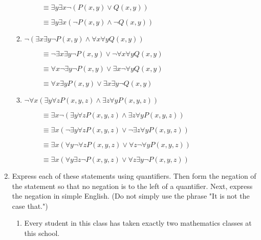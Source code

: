 \documentclass[11pt]{article}
\begin{document}
\begin{enumerate}[label=\textbf{\arabic*.}]
\begin{enumerate}[label=\textbf{\alph*)}]
		$\hspace{1cm}\equiv \exists y\exists x\neg(P(x, y) \lor Q(x, y))$
		
		$\hspace{1cm}\equiv \exists y\exists x(\neg P(x, y) \land \neg Q(x, y))$
		
		\item $\neg(\exists x\exists y\neg P(x, y) \land \forall x\forall yQ(x, y))$
		
		$\hspace{1cm}\equiv \neg\exists x\exists y\neg P(x, y) \lor \neg\forall x\forall yQ(x, y)$
		
		$\hspace{1cm}\equiv \forall x\neg\exists y\neg P(x, y) \lor \exists x\neg\forall yQ(x, y)$
		
		$\hspace{1cm}\equiv \forall x\exists yP(x, y) \lor \exists x\exists y\neg Q(x, y)$
		
		\item $\neg\forall x(\exists y\forall zP(x, y, z) \land \exists z\forall yP(x, y, z))$
		
		$\hspace{1cm}\equiv \exists x\neg(\exists y\forall zP(x, y, z) \land \exists z\forall yP(x, y, z))$
		
		$\hspace{1cm}\equiv \exists x(\neg\exists y\forall zP(x, y, z) \lor \neg\exists z\forall yP(x, y, z))$
		
		$\hspace{1cm}\equiv \exists x(\forall y\neg\forall zP(x, y, z) \lor \forall z\neg\forall yP(x, y, z))$
		
		$\hspace{1cm}\equiv \exists x(\forall y\exists z\neg P(x, y, z) \lor \forall z\exists y\neg P(x, y, z))$
	\end{enumerate}

	\item Express each of these statements using quantifiers. Then form the negation of the statement so that no negation is to the left of a quantifier. Next, express the negation in simple English. (Do not simply use the phrase "It is not the case that.")
	\begin{enumerate}[label=\textbf{\alph*)}]
		\item Every student in this class has taken exactly two mathematics classes at this school.
		

\end{enumerate}
\end{enumerate}
\end{document}
